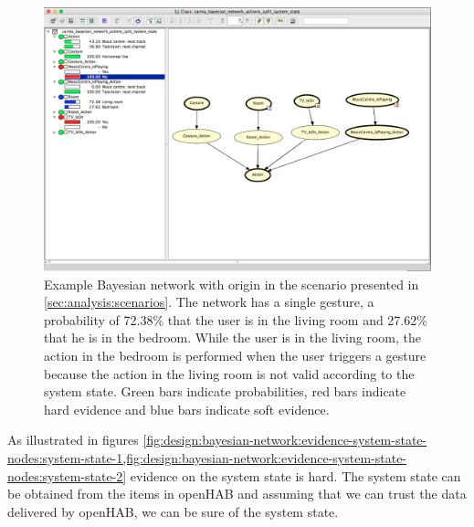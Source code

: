 \begin{figure}[h!]
\centering
\includegraphics[width=\textwidth]{images/bayesian-split-system-state-2}
\caption{Example Bayesian network with origin in the scenario presented in \cref{sec:analysis:scenarios}. The network has a single gesture, a probability of 72.38\% that the user is in the living room and 27.62\% that he is in the bedroom. While the user is in the living room, the action in the bedroom is performed when the user triggers a gesture because the action in the living room is not valid according to the system state. Green bars indicate probabilities, red bars indicate hard evidence and blue bars indicate soft evidence.}
\label{fig:design:bayesian-network:evidence-system-state-nodes:system-state-2}
\end{figure}

As illustrated in figures \cref{fig:design:bayesian-network:evidence-system-state-nodes:system-state-1,fig:design:bayesian-network:evidence-system-state-nodes:system-state-2} evidence on the system state is hard. The system state can be obtained from the items in openHAB and assuming that we can trust the data delivered by openHAB, we can be sure of the system state.

